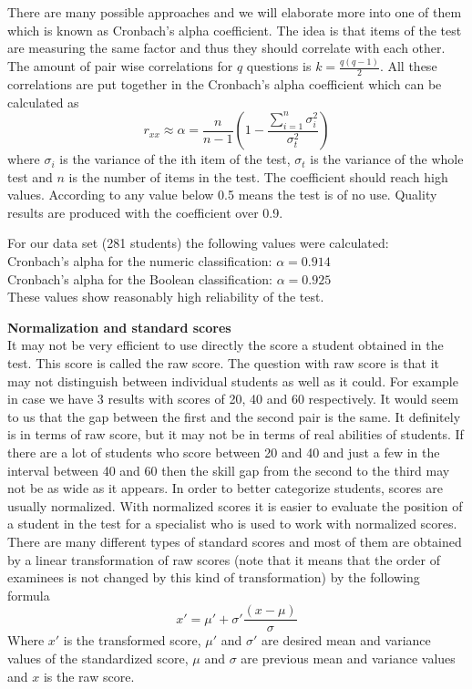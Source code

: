 There are many possible approaches and we will elaborate more into one of them which is known as Cronbach’s alpha coefficient. The idea is that items of the test are measuring the same factor and thus they should correlate with each other. The amount of pair wise correlations for $q$ questions is ${k=\frac{q(q-1)}{2}}$. All these correlations are put together in the Cronbach’s alpha coefficient which can be calculated as
$$r_{xx}\approx\alpha=\frac{n}{n-1}\left(1-\frac{\sum_{i=1}^{n}\sigma_i^2}{\sigma_t^2}\right)$$
where $\sigma_i$ is the variance of the ith item of the test, $\sigma_t$ is the variance of the whole test and $n$ is the number of items in the test. The coefficient should reach high values. According to \cite{1964psychometrics} any value below 0.5 means the test is of no use. Quality results are produced with the coefficient over 0.9.

For our data set (281 students) the following values were calculated:\\
Cronbach’s alpha for the numeric classification: $\alpha = 0.914$\\
Cronbach’s alpha for the Boolean classification: $\alpha = 0.925$\\
These values show reasonably high reliability of the test.

\textbf{Normalization and standard scores}\\
It may not be very efficient to use directly the score a student obtained in the test. This score is called the raw score. The question with raw score is that it may not distinguish between individual students as well as it could. For example in case we have 3 results with scores of 20, 40 and 60 respectively. It would seem to us that the gap between the first and the second pair is the same. It definitely is in terms of raw score, but it may not be in terms of real abilities of students. If there are a lot of students who score between 20 and 40 and just a few in the interval between 40 and 60 then the skill gap from the second to the third may not be as wide as it appears. In order to better categorize students, scores are usually normalized. With normalized scores it is easier to evaluate the position of a student in the test for a specialist who is used to work with normalized scores. There are many different types of standard scores and most of them are obtained by a linear transformation of raw scores (note that it means that the order of examinees is not changed by this kind of transformation) by the following formula
$$x'=\mu'+\sigma'\frac{(x-\mu)}{\sigma}$$  
Where $x'$ is the transformed score, $\mu'$ and $\sigma'$ are desired mean and variance values of the standardized score, $\mu$ and $\sigma$ are previous mean and variance values and $x$ is the raw score. 

